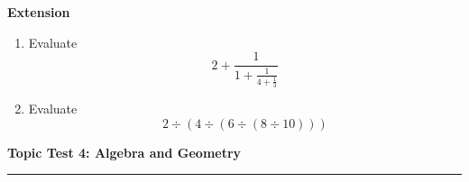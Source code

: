 \documentclass[12pt]{article}
\begin{document}
\newpage

\noindent \textbf{Extension}

\begin{enumerate}
    \item Evaluate
    \[
    2 + \frac{1}{1+\frac{1}{4+\frac{1}{3}}}
    \]

    \vspace{8cm}

    \item Evaluate 
    \[
    2 \div ( 4 \div ( 6 \div ( 8 \div 10 ) ) )
    \]
\end{enumerate}

\newpage

\noindent \textbf{Topic Test 4: Algebra and Geometry}

\medskip

\hrule 

\medskip
\end{document}
